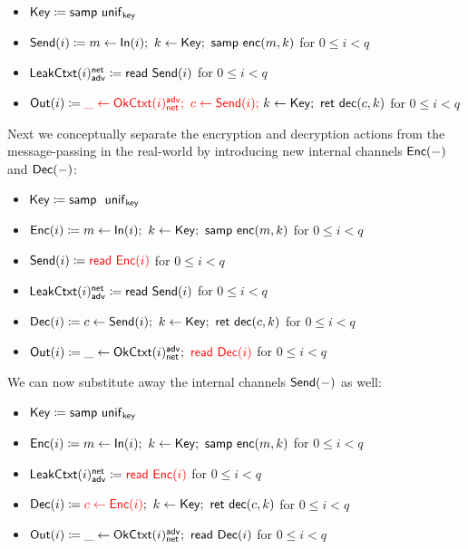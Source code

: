 \begin{itemize}
\item $\mathsf{Key} \coloneqq \mathsf{samp} \ \mathsf{unif}_{\mathsf{key}}$
\item $\mathsf{Send}(i) \coloneqq m \leftarrow \mathsf{In}(i); \ k \leftarrow \mathsf{Key}; \ \mathsf{samp} \ \mathsf{enc}(m,k)$ for $0 \leq i < q$
\item $\mathsf{LeakCtxt}(i)^{\mathsf{net}}_{\mathsf{adv}} \coloneqq \mathsf{read} \ \mathsf{Send}(i)$ for $0 \leq i < q$
\item $\mathsf{Out}(i) \coloneqq {\color{red} \_ \leftarrow \mathsf{OkCtxt}(i)^{\mathsf{adv}}_{\mathsf{net}}; \ c \leftarrow \mathsf{Send}(i); \ } k \leftarrow \mathsf{Key}; \ \mathsf{ret} \ \mathsf{dec}(c,k)$ for $0 \leq i < q$
\end{itemize}

\noindent Next we conceptually separate the encryption and decryption actions from the message-passing in the real-world by introducing new internal channels $\mathsf{Enc}(-)$ and $\mathsf{Dec}(-)$:

\begin{itemize}
\item $\Key \coloneqq \samp \ \unif_\key$
\item {\color{red} $\mathsf{Enc}(i) \coloneqq m \leftarrow \mathsf{In}(i); \ k \leftarrow \mathsf{Key}; \ \mathsf{samp} \ \mathsf{enc}(m,k)$ for $0 \leq i < q$}
\item $\mathsf{Send}(i) \coloneqq {\color{red} \mathsf{read} \ \mathsf{Enc}(i)}$ for $0 \leq i < q$
\item $\mathsf{LeakCtxt}(i)^{\mathsf{net}}_{\mathsf{adv}} \coloneqq \mathsf{read} \ \mathsf{Send}(i)$ for $0 \leq i < q$
\item {\color{red} $\mathsf{Dec}(i) \coloneqq c \leftarrow \mathsf{Send}(i); \ k \leftarrow \mathsf{Key}; \ \mathsf{ret} \ \mathsf{dec}(c,k)$ for $0 \leq i < q$}
\item $\mathsf{Out}(i) \coloneqq \_ \leftarrow \mathsf{OkCtxt}(i)^{\mathsf{adv}}_{\mathsf{net}}; \ {\color{red} \mathsf{read} \ \mathsf{Dec}(i)}$ for $0 \leq i < q$
\end{itemize}

\noindent We can now substitute away the internal channels $\mathsf{Send}(-)$ as well:

\begin{itemize}
\item $\mathsf{Key} \coloneqq \mathsf{samp} \ \mathsf{unif}_{\mathsf{key}}$
\item $\mathsf{Enc}(i) \coloneqq m \leftarrow \mathsf{In}(i); \ k \leftarrow \mathsf{Key}; \ \mathsf{samp} \ \mathsf{enc}(m,k)$ for $0 \leq i < q$
\item $\mathsf{LeakCtxt}(i)^{\mathsf{net}}_{\mathsf{adv}} \coloneqq {\color{red} \mathsf{read} \ \mathsf{Enc}(i)}$ for $0 \leq i < q$
\item $\mathsf{Dec}(i) \coloneqq {\color{red} c \leftarrow \mathsf{Enc}(i)}; \ k \leftarrow \mathsf{Key}; \ \mathsf{ret} \ \mathsf{dec}(c,k)$ for $0 \leq i < q$
\item $\mathsf{Out}(i) \coloneqq \_ \leftarrow \mathsf{OkCtxt}(i)^{\mathsf{adv}}_{\mathsf{net}}; \ \mathsf{read} \ \mathsf{Dec}(i)$ for $0 \leq i < q$
\end{itemize}

